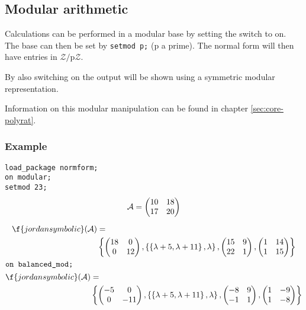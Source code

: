 

\subsection{Modular arithmetic}
\label{sec:normform-modular}

Calculations can be performed in a modular base by setting the switch 
to on. The base can then be set by \texttt{setmod p;} (p a prime). The 
normal form will then have entries in $\mathcal{Z}/$p$\mathcal{Z}$. 

By also switching on  the output will be shown using
a symmetric modular representation. 

Information on this modular manipulation can be found in chapter \ref{sec:core-polyrat}.

\subsubsection{Example}

\texttt{load\_package normform;} \\
\texttt{on modular;} \\
\texttt{setmod 23;} 
\begin{gather*}
\mathcal{A} = \begin{pmatrix} 10 & 18 \\ 17 & 20 \end{pmatrix} \\[2mm]
\begin{split}
\f{jordansymbolic}(\mathcal{A}) &= \\ 
&\left\{
 \begin{pmatrix} 18 & 0 \\ 0 & 12 \end{pmatrix},
 \left\{ \left\{ \lambda + 5, \lambda + 11  \right\}, \lambda \right\}, 
         \begin{pmatrix} 15 & 9 \\ 22 & 1 \end{pmatrix},
         \begin{pmatrix} 1 & 14 \\ 1 & 15 \end{pmatrix} \right\}
\end{split} \\
\intertext{\texttt{on balanced\_mod;}}
\begin{split}
\f{jordansymbolic}(\mathcal{A}) & = \\
&\left\{
  \begin{pmatrix} -5 & 0 \\ 0 & -11 \end{pmatrix},
  \left\{ \left\{ \lambda + 5, \lambda + 11  \right\}, \lambda \right\}, 
  \begin{pmatrix} -8 & 9 \\ -1 & 1 \end{pmatrix},
  \begin{pmatrix} 1 & -9 \\ 1 & -8 \end{pmatrix} \right\}
\end{split}
\end{gather*}

